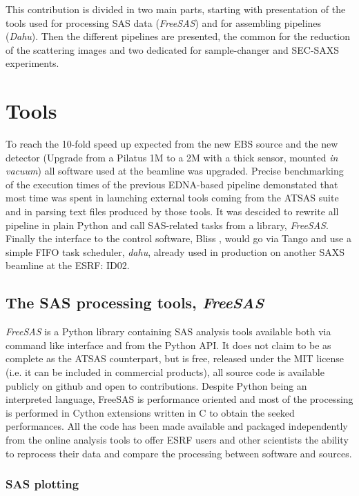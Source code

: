 \documentclass[preprint]{iucr}              %
\begin{document}
This contribution is divided in two main parts, starting with presentation of the tools used for 
processing SAS data (\textit{FreeSAS}) and for assembling pipelines (\textit{Dahu}).
Then the different pipelines are presented, the common for the reduction of the scattering images and two dedicated for sample-changer and SEC-SAXS experiments.      

\section{Tools}

To reach the 10-fold speed up expected from the new EBS source and the new detector (Upgrade from a Pilatus 1M to a 2M with a thick sensor, mounted \textit{in vacuum})
all software used at the beamline was upgraded.
Precise benchmarking of the execution times of the previous EDNA-based pipeline demonstated that 
most time was spent in launching external tools coming from the ATSAS suite and in parsing text files produced by those tools.
It was descided to rewrite all pipeline in plain Python \cite{python} and call SAS-related tasks from a library, \textit{FreeSAS}. 
Finally the interface to the control software, Bliss \cite{bliss}, would go via Tango \cite{tango} and use a simple FIFO task scheduler,  \textit{dahu}, 
already used in production on another SAXS beamline at the ESRF: ID02\cite{ID02}.   

\subsection{The SAS processing tools, \textit{FreeSAS}}

\textit{FreeSAS} is a Python\cite{python} library containing SAS analysis tools available both via command like interface and from the Python API. 
It does not claim to be as complete as the ATSAS counterpart,
but is free, released under the MIT license (i.e. it can be included in commercial products), all source code is available publicly on github \cite{freesas} and
open to contributions.
Despite Python being an interpreted language, FreeSAS is performance oriented and most of the processing is performed in Cython\cite{cython} extensions written in C 
to obtain the seeked performances. 
All the code has been made available and packaged independently from the online analysis tools to offer ESRF users and other scientists
the ability to reprocess their data and compare the processing between software and sources.

\subsubsection{SAS plotting}
\end{document}
